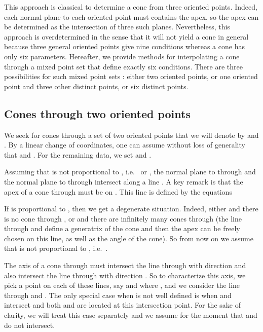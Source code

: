 \documentclass[5p]{elsarticle}
\newcommand{\com}[1]{{\color{black} #1}}
\begin{document}
\medskip

\com{This approach} is classical to determine a cone from three oriented points. Indeed, each normal plane to each oriented point must contains the apex, so the apex can be determined as the intersection of three such planes. Nevertheless, this approach is overdetermined in the sense that it will not yield a cone in general \com{because} three general oriented points give nine conditions whereas a cone has only six parameters. Hereafter, we provide methods for interpolating a cone through a mixed point set that define exactly six conditions. There are three possibilities \com{for such} mixed point sets : either two oriented points, or one oriented point and three other distinct points, or six distinct points. 


\subsection{Cones through two oriented points} 

We seek for cones through a set  of two oriented points that we will denote by  and . By a linear change of coordinates, one can assume without loss of generality that  and  . For the remaining data, we set  and .

\medskip

Assuming that  is not proportional to , i.e.~ or , the normal plane to  through  and the normal plane \com{} to  through  intersect along a line . A key remark is that the apex of a cone through  must be on . This line is defined by the equations 

If  is proportional to , then we get a \com{degenerate} situation. Indeed, either  and there is no cone through , \com{or}  and there are infinitely many cones through  (the line through  and  define a generatrix of the cone and then the apex can be freely chosen on this line, as well as the angle of the cone). \com{So from} now on we  assume that  is not proportional to , i.e.~.

\medskip 

The axis of a cone through  must intersect the line  through  with direction  and also intersect the line  through  with direction . So to characterize this axis, we pick a point on each of these lines, say  and  where , and we consider the line  through  and . The only special case when  is not well defined is when 
 and  intersect and both  and  are located at this intersection point. For the sake of clarity, we will treat this case separately and we assume for the moment that  and  do not intersect. 
\end{document}
